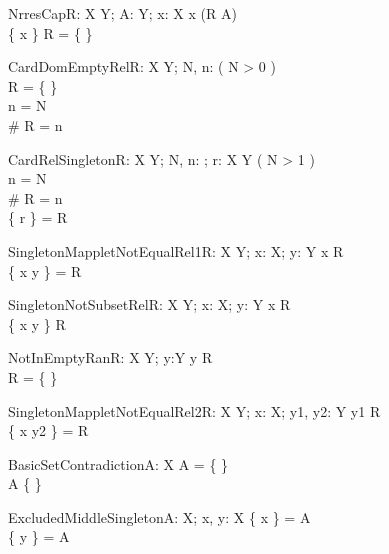 \begin{theorem}{NrresCap}{R: X \rel Y; A: \power Y; x: X}
x \in \dom (R \nrres A) \\
\{ x \} \cap \dom R = \{ \}
\end{theorem}

\begin{theorem}{CardDomEmptyRel}{R: X \rel Y; \const N, n: \nat}
\eval( N > 0 ) \\
R = \{ \} \\
n = N \\
\# \dom R = n
\end{theorem}

\begin{theorem}{CardRelSingleton}{R: X \rel Y; \const N, n: \nat; r: X \cross Y}
\eval( N > 1 ) \\
n = N \\
\# \dom R = n \\
\{ r \} = R
\end{theorem}

\begin{theorem}{SingletonMappletNotEqualRel1}{R: X \rel Y; x: X; y: Y}
x \notin \dom R \\
\{ x \mapsto y \} = R
\end{theorem}

\begin{theorem}{SingletonNotSubsetRel}{R: X \rel Y; x: X; y: Y}
x \notin \dom R \\
\{ x \mapsto y \} \subset R
\end{theorem}

\begin{theorem}{NotInEmptyRan}{R: X \rel Y; y:Y}
y \in \ran R \\
R = \{ \}
\end{theorem}

\begin{theorem}{SingletonMappletNotEqualRel2}{R: X \rel Y; x: X; \const y1, \const y2: Y}
y1 \in \ran R \\
\{ x \mapsto y2 \} = R
\end{theorem}

\begin{theorem}{BasicSetContradiction}{A: \power X}
A = \{ \} \\
A \neq \{ \}
\end{theorem}

\begin{theorem}{ExcludedMiddleSingleton}{A: \power X; \const x, \const y: X}
\{ x \} = A \\
\{ y \} = A
\end{theorem}

